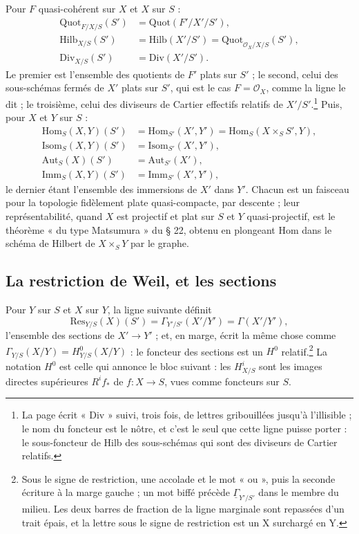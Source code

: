 \documentclass[11pt,a4paper]{article}
\begin{document}
Pour $F$ quasi-cohérent sur $X$ et $X$ sur $S$ :
\begin{align*}
  \mathrm{Quot}_{F/X/S}(S') &= \mathrm{Quot}(F'/X'/S') , \\
  \mathrm{Hilb}_{X/S}(S') &= \mathrm{Hilb}(X'/S') = \mathrm{Quot}_{\mathcal{O}_X/X/S}(S') , \\
  \mathrm{Div}_{X/S}(S') &= \mathrm{Div}(X'/S') .
\end{align*}
Le premier est l'ensemble des quotients de $F'$ plats sur $S'$ ; le second,
celui des sous-schémas fermés de $X'$ plats sur $S'$, qui est le cas $F =
\mathcal{O}_X$, comme la ligne le dit ; le troisième, celui des diviseurs de
Cartier effectifs relatifs de $X'/S'$.\footnote{La page écrit « Div » suivi,
trois fois, de lettres gribouillées jusqu'à l'illisible ; le nom du foncteur
est le nôtre, et c'est le seul que cette ligne puisse porter : le sous-foncteur
de Hilb des sous-schémas qui sont des diviseurs de Cartier relatifs.} Puis,
pour $X$ et $Y$ sur $S$ :
\begin{align*}
  \mathrm{Hom}_S(X, Y)(S') &= \mathrm{Hom}_{S'}(X', Y') = \mathrm{Hom}_S(X \times_S S', Y) , \\
  \mathrm{Isom}_S(X, Y)(S') &= \mathrm{Isom}_{S'}(X', Y') , \\
  \mathrm{Aut}_S(X)(S') &= \mathrm{Aut}_{S'}(X') , \\
  \mathrm{Imm}_S(X, Y)(S') &= \mathrm{Imm}_{S'}(X', Y') ,
\end{align*}
le dernier étant l'ensemble des immersions de $X'$ dans $Y'$. Chacun est un
faisceau pour la topologie fidèlement plate quasi-compacte, par descente ;
leur représentabilité, quand $X$ est projectif et plat sur $S$ et $Y$
quasi-projectif, est le théorème « du type Matsumura » du § 22, obtenu en
plongeant $\mathrm{Hom}$ dans le schéma de Hilbert de $X \times_S Y$ par le
graphe.

\subsection*{La restriction de Weil, et les sections}

Pour $Y$ sur $S$ et $X$ sur $Y$, la ligne suivante définit
\[
  \mathrm{Res}_{Y/S}(X)(S') = \Gamma_{Y'/S'}(X'/Y') = \Gamma(X'/Y') ,
\]
l'ensemble des sections de $X' \to Y'$ ; et, en marge, écrit la même chose
comme $\Gamma_{Y/S}(X/Y) = H^{0}_{Y/S}(X/Y)$ : le foncteur des sections est
un $H^0$ relatif.\footnote{Sous le signe de restriction, une accolade et le
mot « ou », puis la seconde écriture à la marge gauche ; un mot biffé précède
$\underline{\Gamma}_{Y'/S'}$ dans le membre du milieu. Les deux barres de
fraction de la ligne marginale sont repassées d'un trait épais, et la lettre
sous le signe de restriction est un X surchargé en Y.} La notation $H^0$ est
celle qui annonce le bloc suivant : les $H^{i}_{X/S}$ sont les images directes
supérieures $R^{i}f_{*}$ de $f : X \to S$, vues comme foncteurs sur $S$.
\end{document}
